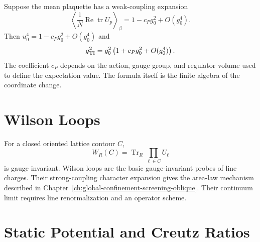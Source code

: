 \begin{example}
\label{ex:tadpole-boosted-coupling-series}
Suppose the mean plaquette has a weak-coupling expansion
\begin{equation}
  \left\langle
    \frac1N\operatorname{Re}\operatorname{tr}U_p
  \right\rangle_\beta
  =
  1-c_P g_0^2+O(g_0^4).
  \label{eq:mean-plaquette-weak-coupling}
\end{equation}
Then \(u_0^4=1-c_Pg_0^2+O(g_0^4)\) and
\begin{equation}
  g_{\rm TI}^2
  =
  g_0^2\left(1+c_Pg_0^2+O(g_0^4)\right).
  \label{eq:tadpole-boosted-coupling-series}
\end{equation}
The coefficient \(c_P\) depends on the action, gauge group, and regulator
volume used to define the expectation value.  The formula itself is the
finite algebra of the coordinate change.
\end{example}

\section{Wilson Loops}

For a closed oriented lattice contour \(C\),
\[
  W_R(C)=\operatorname{Tr}_R\prod_{\ell\in C}U_\ell
\]
is gauge invariant.  Wilson loops are the basic gauge-invariant probes of
line charges.  Their strong-coupling character expansion gives the area-law
mechanism described in Chapter~\ref{ch:global-confinement-screening-oblique}.
Their continuum limit requires line renormalization and an operator scheme.

\section{Static Potential and Creutz Ratios}
\label{sec:lattice-static-potential-creutz-ratios}

